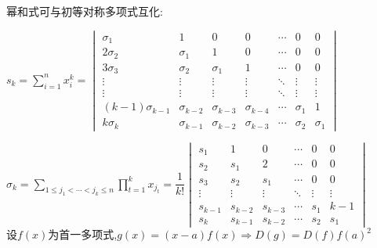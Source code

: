 幂和式可与初等对称多项式互化:

$ s_k=\sum_{i=1}^{n}{x_i^k}=\begin{vmatrix}
\sigma_1  & 1        & 0		& 0 &\cdots  & 0 & 0 \\
2\sigma_2 & \sigma_1 & 1		& 0 & \cdots & 0 & 0\\
3\sigma_3 & \sigma_2 & \sigma_1 & 1 & \cdots & 0 & 0\\
\vdots	  & \vdots   & \vdots   &\vdots & \ddots & \vdots & \vdots \\
\vdots	  & \vdots   & \vdots   &\vdots & \ddots & \vdots & \vdots \\
(k-1)\sigma_{k-1} &\sigma_{k-2} &\sigma_{k-3} & \sigma_{k-4}& \cdots&\sigma_1&1\\
k\sigma_k & \sigma_{k-1} &\sigma_{k-2} &\sigma_{k-3} &\cdots &\sigma_2 &\sigma_1 
\end{vmatrix}$

$ \sigma_k=\sum_{1\le j_1<\cdots <j_k\le n}{\prod_{t=1}^k{x_{j_t}}} = \dfrac{1}{k!}\begin{vmatrix} 
s_1		& 1		& 0		& \cdots & 0 & 0\\
s_2 	& s_1	& 2 	& \cdots & 0 & 0\\
s_3 	& s_2 	& s_1	& \cdots & 0 & 0\\
\vdots  & \vdots& \vdots& \ddots & \vdots & \vdots\\
s_{k-1} &s_{k-2}&s_{k-3}& \cdots &s_1 &k-1\\
s_{k}	&s_{k-1}&s_{k-2}& \cdots &s_2 &s_1
\end{vmatrix}$
\\

设$f(x) $为首一多项式,$ g(x)=(x-a)f(x)\Rightarrow D(g)=D(f)f(a)^2$

